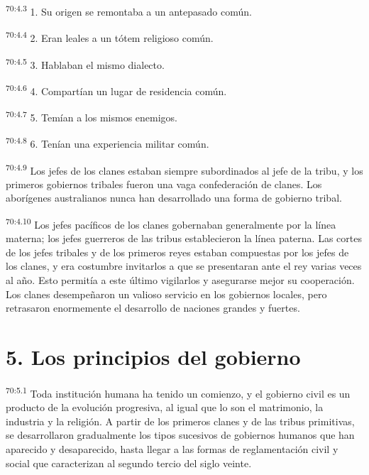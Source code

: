 \par
\textsuperscript{70:4.3} 1. Su origen se remontaba a un antepasado común.

\par
\textsuperscript{70:4.4} 2. Eran leales a un tótem religioso común.

\par
\textsuperscript{70:4.5} 3. Hablaban el mismo dialecto.

\par
\textsuperscript{70:4.6} 4. Compartían un lugar de residencia común.

\par
\textsuperscript{70:4.7} 5. Temían a los mismos enemigos.

\par
\textsuperscript{70:4.8} 6. Tenían una experiencia militar común.

\par
\textsuperscript{70:4.9} Los jefes de los clanes estaban siempre subordinados al jefe de la tribu, y los primeros gobiernos tribales fueron una vaga confederación de clanes. Los aborígenes australianos nunca han desarrollado una forma de gobierno tribal.

\par
\textsuperscript{70:4.10} Los jefes pacíficos de los clanes gobernaban generalmente por la línea materna; los jefes guerreros de las tribus establecieron la línea paterna. Las cortes de los jefes tribales y de los primeros reyes estaban compuestas por los jefes de los clanes, y era costumbre invitarlos a que se presentaran ante el rey varias veces al año. Esto permitía a este último vigilarlos y asegurarse mejor su cooperación. Los clanes desempeñaron un valioso servicio en los gobiernos locales, pero retrasaron enormemente el desarrollo de naciones grandes y fuertes.

\section*{5. Los principios del gobierno}
\par
\textsuperscript{70:5.1} Toda institución humana ha tenido un comienzo, y el gobierno civil es un producto de la evolución progresiva, al igual que lo son el matrimonio, la industria y la religión. A partir de los primeros clanes y de las tribus primitivas, se desarrollaron gradualmente los tipos sucesivos de gobiernos humanos que han aparecido y desaparecido, hasta llegar a las formas de reglamentación civil y social que caracterizan al segundo tercio del siglo veinte.

